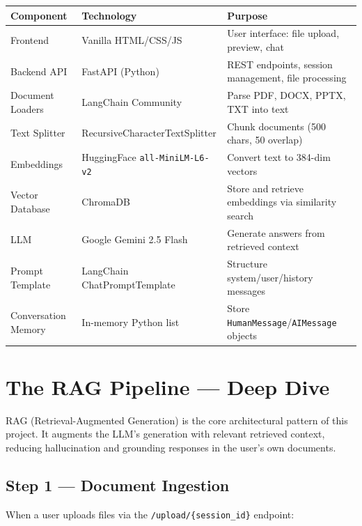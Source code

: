 \documentclass[12pt,a4paper]{article}
\begin{document}
\begin{longtable}{@{}p{3.5cm}p{4cm}p{6cm}@{}}
\toprule
\textbf{Component} & \textbf{Technology} & \textbf{Purpose} \\
\midrule
\endhead
Frontend & Vanilla HTML/CSS/JS & User interface: file upload, preview, chat \\
Backend API & FastAPI (Python) & REST endpoints, session management, file processing \\
Document Loaders & LangChain Community & Parse PDF, DOCX, PPTX, TXT into text \\
Text Splitter & RecursiveCharacterTextSplitter & Chunk documents (500 chars, 50 overlap) \\
Embeddings & HuggingFace \texttt{all-MiniLM-L6-v2} & Convert text to 384-dim vectors \\
Vector Database & ChromaDB & Store and retrieve embeddings via similarity search \\
LLM & Google Gemini 2.5 Flash & Generate answers from retrieved context \\
Prompt Template & LangChain ChatPromptTemplate & Structure system/user/history messages \\
Conversation Memory & In-memory Python list & Store \texttt{HumanMessage}/\texttt{AIMessage} objects \\
\bottomrule
\end{longtable}

\section{The RAG Pipeline — Deep Dive}

RAG (Retrieval-Augmented Generation) is the core architectural pattern of this project. It augments the LLM's generation with relevant retrieved context, reducing hallucination and grounding responses in the user's own documents.

\subsection{Step 1 — Document Ingestion}

When a user uploads files via the \texttt{/upload/\{session\_id\}} endpoint:
\end{document}
